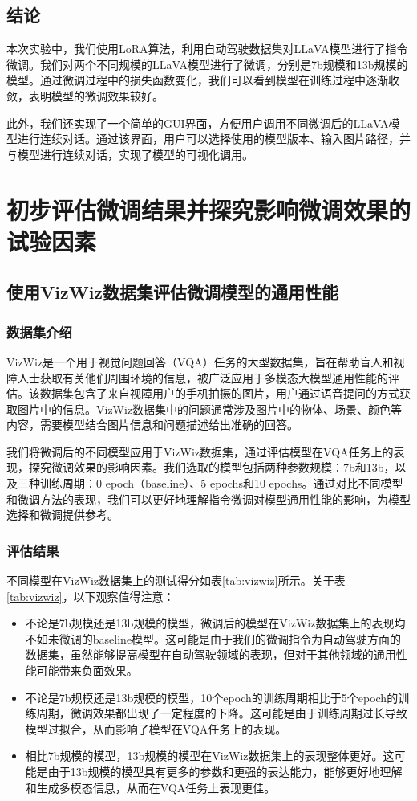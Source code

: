 \documentclass[
    linespread = 1.25
]{ctexart}
\begin{document}
\subsection{结论}

本次实验中，我们使用LoRA算法，利用自动驾驶数据集对LLaVA模型进行了指令微调。我们对两个不同规模的LLaVA模型进行了微调，分别是7b规模和13b规模的模型。通过微调过程中的损失函数变化，我们可以看到模型在训练过程中逐渐收敛，表明模型的微调效果较好。

此外，我们还实现了一个简单的GUI界面，方便用户调用不同微调后的LLaVA模型进行连续对话。通过该界面，用户可以选择使用的模型版本、输入图片路径，并与模型进行连续对话，实现了模型的可视化调用。

\section{初步评估微调结果并探究影响微调效果的试验因素}
\subsection{使用VizWiz数据集评估微调模型的通用性能}

\subsubsection{数据集介绍}

VizWiz是一个用于视觉问题回答（VQA）任务的大型数据集\cite{gurari2018vizwizgrandchallengeanswering}，旨在帮助盲人和视障人士获取有关他们周围环境的信息，被广泛应用于多模态大模型通用性能的评估。该数据集包含了来自视障用户的手机拍摄的图片，用户通过语音提问的方式获取图片中的信息。VizWiz数据集中的问题通常涉及图片中的物体、场景、颜色等内容，需要模型结合图片信息和问题描述给出准确的回答。

我们将微调后的不同模型应用于VizWiz数据集，通过评估模型在VQA任务上的表现，探究微调效果的影响因素。我们选取的模型包括两种参数规模：7b和13b，以及三种训练周期：0 epoch（baseline）、5 epochs和10 epochs。通过对比不同模型和微调方法的表现，我们可以更好地理解指令微调对模型通用性能的影响，为模型选择和微调提供参考。

\subsubsection{评估结果}

不同模型在VizWiz数据集上的测试得分如表\ref{tab:vizwiz}所示。关于表\ref{tab:vizwiz}，以下观察值得注意：
\begin{itemize}
  \item 不论是7b规模还是13b规模的模型，微调后的模型在VizWiz数据集上的表现均不如未微调的baseline模型。这可能是由于我们的微调指令为自动驾驶方面的数据集，虽然能够提高模型在自动驾驶领域的表现，但对于其他领域的通用性能可能带来负面效果。
  \item 不论是7b规模还是13b规模的模型，10个epoch的训练周期相比于5个epoch的训练周期，微调效果都出现了一定程度的下降。这可能是由于训练周期过长导致模型过拟合，从而影响了模型在VQA任务上的表现。
  \item 相比7b规模的模型，13b规模的模型在VizWiz数据集上的表现整体更好。这可能是由于13b规模的模型具有更多的参数和更强的表达能力，能够更好地理解和生成多模态信息，从而在VQA任务上表现更佳。
\end{itemize}
\end{document}
